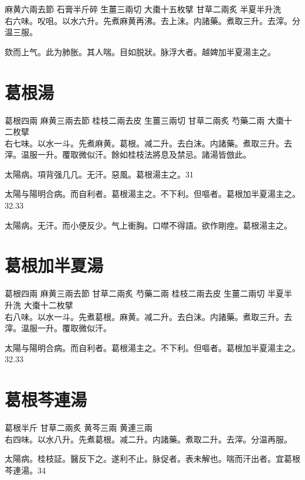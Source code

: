 麻黄{\scriptsize 六兩去節} 石膏{\scriptsize 半斤碎} 生薑{\scriptsize 三兩切} 大棗{\scriptsize 十五枚擘} 甘草{\scriptsize 二兩炙} 半夏{\scriptsize 半升洗}\\
右六味。㕮咀。以水六升。先煮麻黄再沸。去上沫。内諸藥。煮取三升。去滓。分温三服。

欬而上气。此为肺胀。其人喘。目如脱狀。脉浮大者。越婢加半夏湯主之。

\section{葛根湯}

葛根{\scriptsize 四兩} 麻黄{\scriptsize 三兩去節} 桂枝{\scriptsize 二兩去皮} 生薑{\scriptsize 三兩切} 甘草{\scriptsize 二兩炙} 芍藥{\scriptsize 二兩} 大棗{\scriptsize 十二枚擘}\\
右七味。以水一斗。先煮麻黄。葛根。减二升。去白沫。内諸藥。煮取三升。去滓。温服一升。覆取微似汗。餘如桂枝法將息及禁忌。諸湯皆倣此。 

太陽病。項背强几几。无汗。惡風。葛根湯主之。31

太陽与陽明合病。而自利{\khaaitp 者}。葛根湯主之。不下利。但嘔者。葛根加半夏湯主之。32.33

太陽病。无汗。而小便反少。气上衝胸。口噤不得語。欲作剛痙。葛根湯主之。

\section{葛根加半夏湯}

葛根{\scriptsize 四兩} 麻黄{\scriptsize 三兩去節} 甘草{\scriptsize 二兩炙} 芍藥{\scriptsize 二兩} 桂枝{\scriptsize 二兩去皮} 生薑{\scriptsize 二兩切} 半夏{\scriptsize 半升洗} 大棗{\scriptsize 十二枚擘}\\
右八味。以水一斗。先煮葛根。麻黄。减二升。去白沫。内諸藥。煮取三升。去滓。温服一升。覆取微似汗。

太陽与陽明合病。而自利{\khaaitp 者}。葛根湯主之。不下利。但嘔者。葛根加半夏湯主之。32.33

\section{葛根芩連湯}

葛根{\scriptsize 半斤} 甘草{\scriptsize 二兩炙} 黄芩{\scriptsize 三兩} 黄連{\scriptsize 三兩}\\
右四味。以水八升。先煮葛根。减二升。内諸藥。煮取二升。去滓。分温再服。

太陽病。桂枝証。醫反下之。遂利不止。脉促者。表未解也。喘而汗出者。宜葛根芩連湯。34

